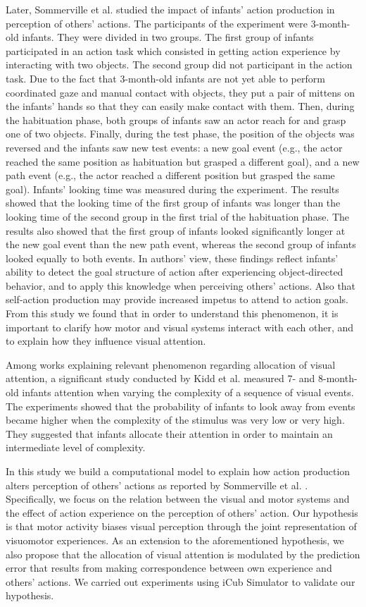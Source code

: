 \documentclass[conference]{IEEEtran}
\begin{document}
Later, Sommerville et al.\cite{sommerville2005action} studied the impact of infants' action production in perception of others' actions. The participants of the experiment were 3-month-old infants. They were divided in two groups. The first group of infants participated in an action task which consisted in getting action experience by interacting with two objects. The second group did not participant in the action task. Due to the fact that 3-month-old infants are not yet able to perform coordinated gaze and manual contact with objects, they put a pair of mittens on the infants’ hands so that they can easily make contact with them. Then, during the habituation phase, both groups of infants saw an actor reach for and grasp one of two objects. Finally, during the test phase, the position of the objects was reversed and the infants saw new test events: a new goal event (e.g., the actor reached the same position as habituation but grasped a different goal), and a new path event (e.g., the actor reached a different position but grasped the same goal). Infants' looking time was measured during the experiment. The results showed that the looking time of the first group of infants was longer than the looking time of the second group in the first trial of the habituation phase. The results also showed that the first group of infants looked significantly longer at the new goal event than the new path event, whereas the second group of infants looked equally to both events. In authors' view, these findings reflect infants’ ability to detect the goal structure of action after experiencing object-directed behavior, and to apply this knowledge when perceiving others’ actions. Also that self-action production may provide increased impetus to attend to action goals. From this study we found that in order to understand this phenomenon, it is important to clarify how motor and visual systems interact with each other, and to explain how they influence visual attention.

Among works explaining relevant phenomenon regarding allocation of visual attention, a significant study conducted by Kidd et al. \cite{kidd2012goldilocks} measured 7- and 8-month-old infants attention when varying the complexity of a sequence of visual events. The experiments showed that the probability of infants to look away from events became higher when the complexity of the stimulus was very low or very high. They suggested that infants allocate their attention in order to maintain an intermediate level of complexity.

In this study we build a computational model to explain how action production alters perception of others’ actions as reported by Sommerville et al. \cite{sommerville2005action}. Specifically, we focus on the relation between the visual and motor systems and the effect of action experience on the perception of others’ action. Our hypothesis is that motor activity biases visual perception through the joint representation of visuomotor experiences. As an extension to the aforementioned hypothesis, we also propose that the allocation of visual attention is modulated by the prediction error that results from making correspondence between own experience and others' actions. We carried out experiments using iCub Simulator to validate our hypothesis.
\end{document}

